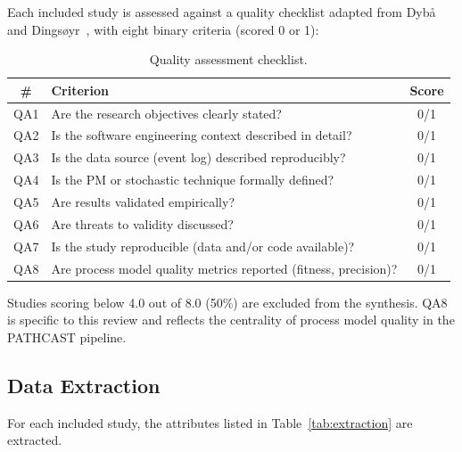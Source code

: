 Each included study is assessed against a quality checklist adapted from Dyb{\aa} and Dingsøyr~\cite{dyba2008}, with eight binary criteria (scored 0 or 1):

\begin{table}[htbp]
\centering
\caption{Quality assessment checklist.}
\label{tab:qa}
\begin{tabular}{clc}
\toprule
\textbf{\#} & \textbf{Criterion} & \textbf{Score} \\
\midrule
QA1 & Are the research objectives clearly stated? & 0/1 \\
QA2 & Is the software engineering context described in detail? & 0/1 \\
QA3 & Is the data source (event log) described reproducibly? & 0/1 \\
QA4 & Is the PM or stochastic technique formally defined? & 0/1 \\
QA5 & Are results validated empirically? & 0/1 \\
QA6 & Are threats to validity discussed? & 0/1 \\
QA7 & Is the study reproducible (data and/or code available)? & 0/1 \\
QA8 & Are process model quality metrics reported (fitness, precision)? & 0/1 \\
\bottomrule
\end{tabular}
\end{table}

Studies scoring below 4.0 out of 8.0 (50\%) are excluded from the synthesis. QA8 is specific to this review and reflects the centrality of process model quality in the PATHCAST pipeline.


\subsection{Data Extraction}
\label{sec:slr-extraction}

For each included study, the attributes listed in Table~\ref{tab:extraction} are extracted.

